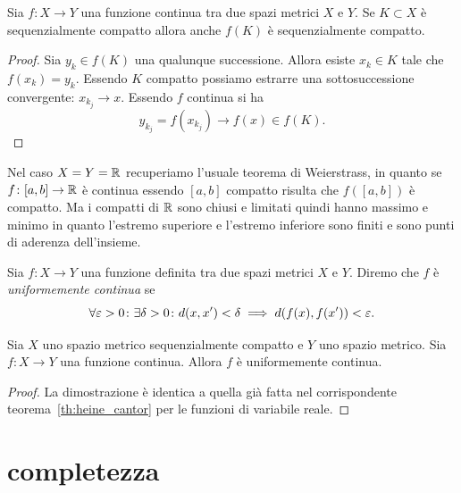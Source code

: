 \begin{theorem}
  \label{th:weiestrass_metrico}%
Sia $f\colon X \to Y$ una funzione continua tra
due spazi metrici $X$ e $Y$.
Se $K\subset X$ è sequenzialmente compatto allora
anche $f(K)$ è sequenzialmente compatto.
\end{theorem}
%
\begin{proof}
Sia $y_k \in f(K)$ una qualunque successione. Allora
esiste $x_k \in K$ tale che $f(x_k) = y_k$.
Essendo $K$ compatto possiamo estrarre una sottosuccessione convergente: $x_{k_j}\to x$. Essendo $f$ continua si ha
\[
  y_{k_j} = f(x_{k_j}) \to f(x) \in f(K).
\]
\end{proof}

Nel caso $X=Y={\mathbb R}$ recuperiamo l'usuale teorema di Weierstrass, in quanto se $f\colon [a,b]\to {\mathbb R}$ è continua essendo $[a,b]$ compatto risulta che $f([a,b])$ è compatto. Ma i compatti di ${\mathbb R}$ sono chiusi e limitati quindi hanno massimo e minimo in quanto l'estremo superiore e l'estremo inferiore sono finiti e sono punti di aderenza dell'insieme.

\begin{definition}
  Sia $f\colon X \to Y$ una funzione definita tra due spazi metrici $X$ e $Y$.
  Diremo che $f$ è \emph{uniformemente continua}%
 se 
  \[
  \forall \varepsilon>0 \colon \exists \delta>0 \colon 
    d(x,x')< \delta \implies d(f(x),f(x'))<\varepsilon. 
  \]
\end{definition}

\begin{theorem}
%
Sia $X$ uno spazio metrico sequenzialmente compatto e $Y$ uno spazio metrico.
Sia $f\colon X\to Y$ una funzione continua. Allora $f$ è uniformemente continua.
\end{theorem}
%
\begin{proof}
  La dimostrazione è identica a quella già fatta nel corrispondente 
  teorema~\ref{th:heine_cantor} per le funzioni di variabile reale.
\end{proof}

\section{completezza}

